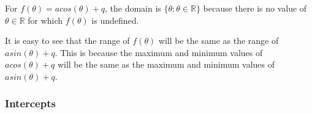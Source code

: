           
          \label{m39414*id88263}For \begin{math}f\left(\theta \right)=acos\left(\theta \right)+q\end{math}, the domain is \begin{math}\{\theta :\theta \in \mathbb{R}\}\end{math} because there is no value of \begin{math}\theta \in \mathbb{R}\end{math} for which \begin{math}f\left(\theta \right)\end{math} is undefined.\par 
          \label{m39414*id88363}It is easy to see that the range of \begin{math}f\left(\theta \right)\end{math} will be the same as the range of \begin{math}asin\left(\theta \right)+q\end{math}. This is because the maximum and minimum values of \begin{math}acos\left(\theta \right)+q\end{math} will be the same as the maximum and minimum values of \begin{math}asin\left(\theta \right)+q\end{math}.\par 
        
        \label{m39414*uid67}
            \subsubsection{ Intercepts}
            \nopagebreak
            
